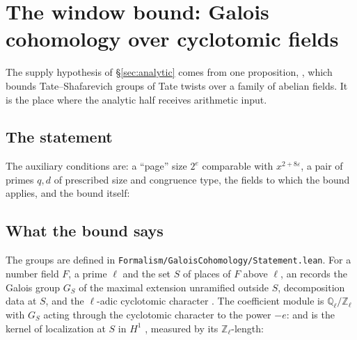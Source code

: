 \section{The window bound: Galois cohomology over cyclotomic fields}\label{sec:window}

The supply hypothesis of \S\ref{sec:analytic} comes from one proposition, ,
which bounds Tate--Shafarevich groups of Tate twists over a family of abelian fields. It is the place
where the analytic half receives arithmetic input.

\subsection{The statement}

\noindent The auxiliary conditions are: a ``page'' size $2^{e}$ comparable with $x^{2+8\varepsilon}$,
\noindent a pair of primes $q,d$ of prescribed size and congruence type,
\noindent the fields to which the bound applies,
\noindent and the bound itself:

\subsection{What the bound says}

The groups are defined in \texttt{Formalism/GaloisCohomology/Statement.lean}. For a number field $F$,
a prime $\ell$ and the set $S$ of places of $F$ above $\ell$, an 
records the Galois group $G_S$ of the maximal extension unramified outside $S$, decomposition data at
$S$, and the $\ell$-adic cyclotomic character
. The coefficient module is
$\mathbb Q_\ell/\mathbb Z_\ell$ with $G_S$ acting through the cyclotomic character to the power
$-e$:
\noindent and  is the kernel of localization at $S$ in
$H^1$ , measured by its
$\mathbb Z_\ell$-length:

